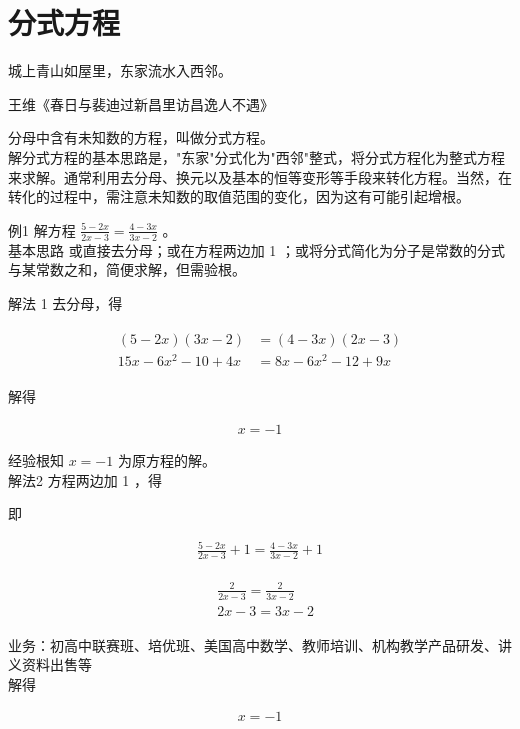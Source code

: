 \documentclass[10pt]{article}
\begin{document}
\section*{分式方程}
城上青山如屋里，东家流水入西邻。

王维《春日与裴迪过新昌里访昌逸人不遇》

分母中含有未知数的方程，叫做分式方程。\\
解分式方程的基本思路是，"东家"分式化为"西邻"整式，将分式方程化为整式方程来求解。通常利用去分母、换元以及基本的恒等变形等手段来转化方程。当然，在转化的过程中，需注意未知数的取值范围的变化，因为这有可能引起增根。

例1 解方程 $\frac{5-2 x}{2 x-3}=\frac{4-3 x}{3 x-2}$ 。\\
基本思路 或直接去分母；或在方程两边加 1 ；或将分式简化为分子是常数的分式与某常数之和，简便求解，但需验根。

解法 1 去分母，得

\begin{align*}
\begin{aligned}
(5-2 x)(3 x-2) & =(4-3 x)(2 x-3) \\
15 x-6 x^{2}-10+4 x & =8 x-6 x^{2}-12+9 x
\end{aligned}
\end{align*}

解得

\begin{align*}
x=-1
\end{align*}

经验根知 $x=-1$ 为原方程的解。\\
解法2 方程两边加 1 ，得

即

\begin{align*}
\frac{5-2 x}{2 x-3}+1=\frac{4-3 x}{3 x-2}+1
\end{align*}

\begin{align*}
\begin{aligned}
& \frac{2}{2 x-3}=\frac{2}{3 x-2} \\
& 2 x-3=3 x-2
\end{aligned}
\end{align*}

业务：初高中联赛班、培优班、美国高中数学、教师培训、机构教学产品研发、讲义资料出售等\\
解得

\begin{align*}
x=-1
\end{align*}
\end{document}
